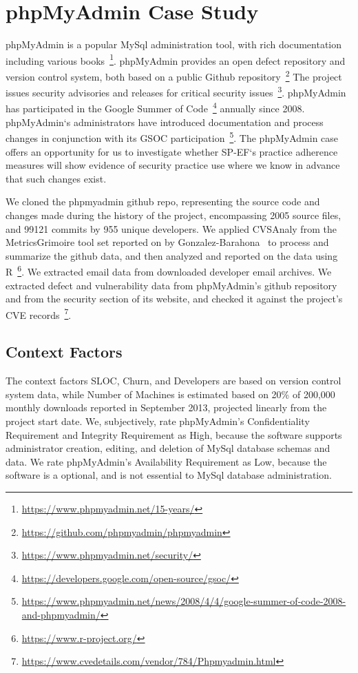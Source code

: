 \section{phpMyAdmin Case Study}
\label{sec:case_pma}
	
phpMyAdmin is a popular MySql administration tool, with rich documentation including various books~\footnote{\url{https://www.phpmyadmin.net/15-years/}}. phpMyAdmin provides an open defect repository and version control system, both based on a public Github repository~\footnote{\url{https://github.com/phpmyadmin/phpmyadmin}} The project issues security advisories and releases for critical security issues~\footnote{\url{https://www.phpmyadmin.net/security/}}. 
phpMyAdmin has participated in the Google Summer of Code~\footnote{\url{https://developers.google.com/open-source/gsoc/}} annually since 2008. phpMyAdmin`s administrators have introduced documentation and process changes in conjunction with its GSOC participation~\footnote{\url{https://www.phpmyadmin.net/news/2008/4/4/google-summer-of-code-2008-and-phpmyadmin/}}. The phpMyAdmin case offers an opportunity for us to investigate whether SP-EF`s practice adherence measures will show evidence of security practice use where we know in advance that such changes exist.

We cloned the phpmyadmin github repo, representing the source code and changes made during the history of the project, encompassing 2005 source files, and 99121 commits by 955 unique developers. We applied CVSAnaly from the MetricsGrimoire tool set reported on by Gonzalez-Barahona~\cite{barahona2015metrics} to process and summarize the github data, and then analyzed and reported on the data using R~\footnote{\url{https://www.r-project.org/}}. We extracted email data from downloaded developer email archives. We extracted defect and vulnerability data from phpMyAdmin’s github repository and from the security section of its website, and checked it against the project’s CVE records~\footnote{\url{https://www.cvedetails.com/vendor/784/Phpmyadmin.html}}. 

\subsection{Context Factors}

The context factors SLOC, Churn, and Developers are based on version control system data, while Number of Machines is estimated based on 20\% of 200,000 monthly downloads reported in September 2013, projected linearly from the project start date. We, subjectively, rate phpMyAdmin’s Confidentiality Requirement and Integrity Requirement as High, because the software supports administrator creation, editing, and deletion of MySql database schemas and data. We rate phpMyAdmin’s Availability Requirement as Low, because the software is a optional, and is not essential to MySql database administration.

